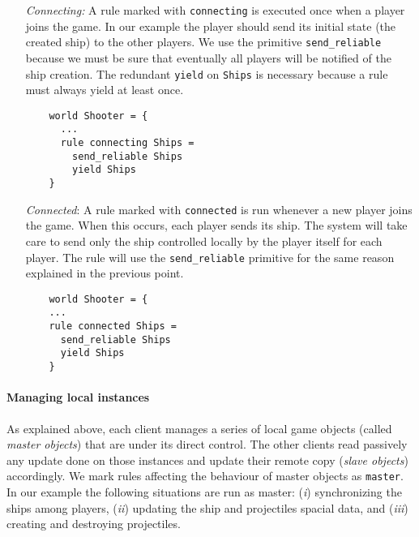\begin{itemize}
	\item[\textit{Connecting:}] A rule marked with \texttt{connecting} is executed once when a player joins the game. In our example the player should send its initial state (the created ship) to the other players. We use the primitive \texttt{send\_reliable} because we must be sure that eventually all players will be notified of the ship creation. The redundant \texttt{yield} on \texttt{Ships} is necessary because a rule must always yield at least once.
	\begin{lstlisting}
	world Shooter = {
	  ...
	  rule connecting Ships =
	    send_reliable Ships
	    yield Ships
	}
	\end{lstlisting}
	
	\item [\textit{Connected}:] A rule marked with \texttt{connected} is run whenever a new player joins the game. When this occurs, each player sends its ship. The system will take care to send only the ship controlled locally by the player itself for each player. The rule will use the \texttt{send\_reliable} primitive for the same reason explained in the previous point.
	\begin{lstlisting}
	world Shooter = {
	...
	rule connected Ships =
	  send_reliable Ships
	  yield Ships
	}
	\end{lstlisting}
\end{itemize}

\paragraph{Managing local instances}
As explained above, each client manages a series of local game objects (called \textit{master objects}) that are under its direct control. The other clients read passively any update done on those instances and update their remote copy  (\textit{slave objects}) accordingly. We mark rules affecting the behaviour of master objects as \texttt{master}. In our example the following situations are run as master: (\textit{i}) synchronizing the ships among players, (\textit{ii}) updating the ship and projectiles spacial data, and (\textit{iii}) creating and destroying projectiles.

